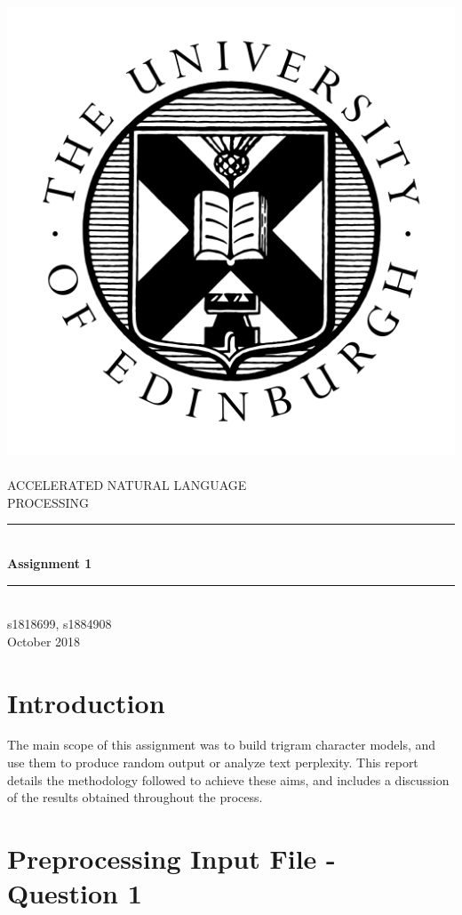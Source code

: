 \documentclass[12pt]{article}
\begin{document}
	
	
\begin{titlepage}
	\newcommand{\HRule}{\rule{\linewidth}{0.5mm}} %
	\center %
	\includegraphics[width = 0.3 \linewidth]{"./graphics/avatar-roundel-blackonwhite"}\\[0.5cm]
	\textsc{\\[1cm]\LARGE ACCELERATED NATURAL LANGUAGE \\
             \hfill\break PROCESSING}\\[2cm]

	\HRule \\[0.4cm]
	{ \huge \bfseries Assignment 1}\\[0.1cm]
	\HRule \\[1.5cm]
	\Large
	\vfill
	 s1818699, s1884908\\[0.5cm]
	{\large October 2018}
\end{titlepage}
\setlength\parindent{0pt}		
\newpage
\onehalfspacing
\tableofcontents
\singlespacing
\newpage
	
\section{Introduction}
The main scope of this assignment was to build trigram character models, and use them to produce random output or analyze text perplexity.  This report details the methodology followed to achieve these aims, and includes a discussion of the results obtained throughout the process.
\section{Preprocessing Input File - Question 1}
\label{PreProc}
\end{document}
